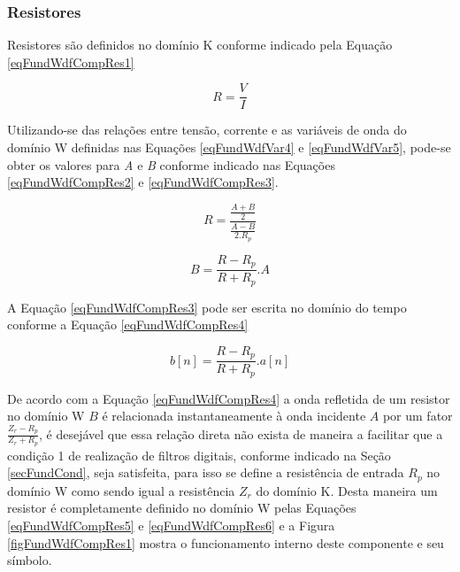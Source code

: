 	
	 
		\subsubsection{Resistores}
	
	Resistores são definidos no domínio K conforme indicado pela Equação \ref{eqFundWdfCompRes1}
	
	\begin{equation}
		\label{eqFundWdfCompRes1}
		R = \frac{V}{I}
	\end{equation}
	
	Utilizando-se das relações entre tensão, corrente e as variáveis de onda do domínio W definidas nas Equações \ref{eqFundWdfVar4} e \ref{eqFundWdfVar5}, pode-se obter os valores para \textit{A} e \textit{B} conforme indicado nas Equações \ref{eqFundWdfCompRes2} e \ref{eqFundWdfCompRes3}.
	
	\begin{equation}
		\label{eqFundWdfCompRes2}
		R = \frac{\frac{A+B}{2}}{\frac{A-B}{2.R_p}}
	\end{equation}  
	
	\begin{equation}
		\label{eqFundWdfCompRes3}
		B = \frac{R-R_p}{R+R_p}.A
	\end{equation}
	
	A Equação \ref{eqFundWdfCompRes3} pode ser escrita no domínio do tempo conforme a Equação \ref{eqFundWdfCompRes4}
	
	\begin{equation}
		\label{eqFundWdfCompRes4}
		b[n] = \frac{R-R_p}{R+R_p}.a[n]
	\end{equation}
	
	De acordo com a Equação \ref{eqFundWdfCompRes4} a onda refletida de um resistor no domínio W $B$ é relacionada instantaneamente à onda incidente $A$ por um fator $\frac{Z_r-R_p}{Z_r+R_p}$, é desejável que essa relação direta não exista de maneira a facilitar que a condição 1 de realização de filtros digitais, conforme indicado na Seção \ref{secFundCond}, seja satisfeita, para isso se define a resistência de entrada $R_p$ no domínio W como sendo igual a resistência $Z_r$ do domínio K. Desta maneira um resistor é completamente definido no domínio W pelas Equações \ref{eqFundWdfCompRes5} e \ref{eqFundWdfCompRes6} e a Figura \ref{figFundWdfCompRes1} mostra o funcionamento interno deste componente e seu símbolo.
	
